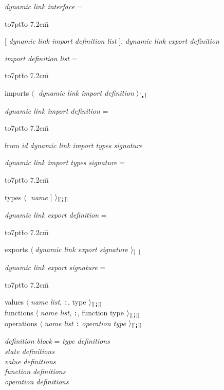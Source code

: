\documentclass[a4paper]{jsarticle}
\newcommand{\K}[1]{{\sf #1}}
\newcommand{\id}[1]{{\it #1\/}}
\newcommand{\AL}{$\langle\;$}
\newcommand{\AR}[1]{$\rangle_{[\hbox{\tt#1}]}\;$}
\newcommand{\ARX}[1]{$\rangle_{[[\hbox{\tt#1}]]}\;$}
\newenvironment{tabbingone}[0]{
\begingroup
  \parskip=0pt
  \topsep=0pt
  \partopsep=0pt
  \begin{tabbing}
    \hbox to7pt{}\=%
    \hbox to 7.2cm{}\=%
    \kill
    \+ %
    \kill
}{
  \end{tabbing}
\endgroup}
\begin{document}
\id{dynamic link interface} = 
\begin{tabbingone}
  {}[ \id{dynamic link import definition list} ], 
  \id{dynamic link export definition}  \\
\end{tabbingone}

\id{import definition list} = 
\begin{tabbingone}
 \K{imports}
  \AL{} \id{dynamic link import definition} \AR{,}  \>  \\
\end{tabbingone}

\id{dynamic link import definition} =
\begin{tabbingone}
  \K{from} \id{id} \id{dynamic link import types signature} \\
\end{tabbingone}

\id{dynamic link import types signature} = 
\begin{tabbingone}
  \K{types} \AL{} \id{name} ] \ARX{;} \\
\end{tabbingone}

\id{dynamic link export definition} =
\begin{tabbingone}
  \K{exports} \AL \id{dynamic link export signature} \AR{\ } \\
\end{tabbingone}

\id{dynamic link export signature} = 
\begin{tabbingone}
  \K{values}  \AL \id{name list}, {\tt:}, type \ARX{;}           \\
  \K{functions} \AL \id{name list}, {\tt:}, function type \ARX{;}  \\
  \K{operations} \AL \id{name list} {\tt:} \id{operation type} \ARX{;}  \> \\
\end{tabbingone}

\begingroup
  \parskip=0pt
  \topsep=0pt
  \partopsep=0pt
\begin{tabbing}
\id{definition block} = \=
  \id{type definitions}  \\
\>  \id{state definitions}  \\
\>  \id{value definitions}  \\
\>  \id{function definitions}  \\
\>  \id{operation definitions} \\
\end{tabbing}
\endgroup
\end{document}
